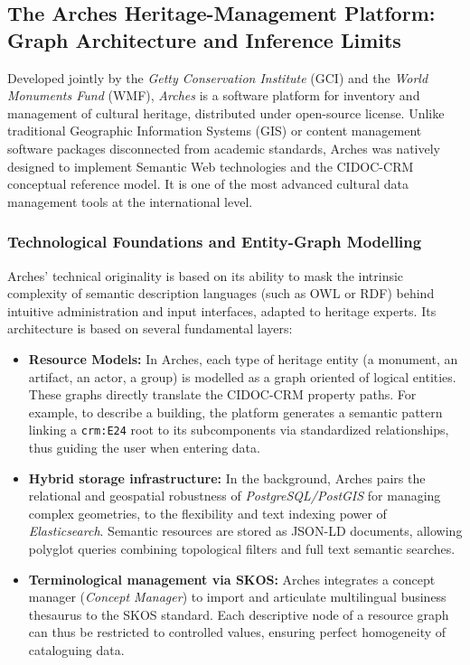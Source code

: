 \documentclass{article}
\begin{document}
\subsection{The Arches Heritage-Management Platform: Graph Architecture and Inference Limits}
\label{subsec:arches_platform_approfondi}

Developed jointly by the \textit{Getty Conservation Institute} (GCI) and the \textit{World Monuments Fund} (WMF), \textit {Arches} is a software platform for inventory and management of cultural heritage, distributed under open-source license. Unlike traditional Geographic Information Systems (GIS) or content management software packages disconnected from academic standards, Arches was natively designed to implement Semantic Web technologies and the CIDOC-CRM conceptual reference model. It is one of the most advanced cultural data management tools at the international level.

\subsubsection{Technological Foundations and Entity-Graph Modelling}

Arches' technical originality is based on its ability to mask the intrinsic complexity of semantic description languages (such as OWL or RDF) behind intuitive administration and input interfaces, adapted to heritage experts. Its architecture is based on several fundamental layers:

\begin{itemize}
\item \textbf{Resource Models:} In Arches, each type of heritage entity (a monument, an artifact, an actor, a group) is modelled as a graph oriented of logical entities. These graphs directly translate the CIDOC-CRM property paths. For example, to describe a building, the platform generates a semantic pattern linking a \texttt{crm:E24} root to its subcomponents via standardized relationships, thus guiding the user when entering data.
\item \textbf {Hybrid storage infrastructure:} In the background, Arches pairs the relational and geospatial robustness of \textit{PostgreSQL/PostGIS} for managing complex geometries, to the flexibility and text indexing power of \textit{Elasticsearch}. Semantic resources are stored as JSON-LD documents, allowing polyglot queries combining topological filters and full text semantic searches.
\item \textbf {Terminological management via SKOS:} Arches integrates a concept manager (\textit{Concept Manager}) to import and articulate multilingual business thesaurus to the SKOS standard. Each descriptive node of a resource graph can thus be restricted to controlled values, ensuring perfect homogeneity of cataloguing data.
\end{itemize}
\end{document}
